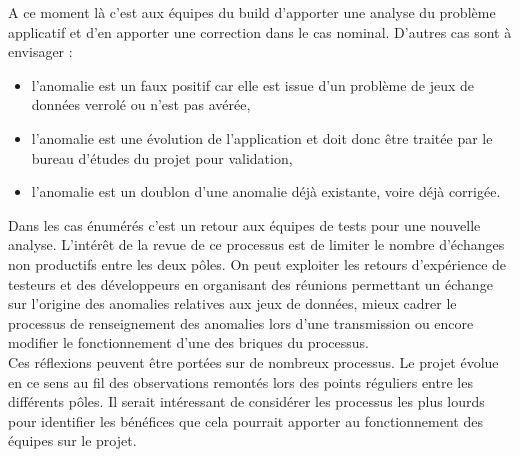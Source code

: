 \documentclass[12pt,a4paper]{article}
\begin{document}
A ce moment là c'est aux équipes du build d'apporter une analyse du problème applicatif et d'en apporter une correction dans le cas nominal. D'autres cas sont à envisager :
\begin{itemize}
\item l'anomalie est un faux positif car elle est issue d'un problème de jeux de données verrolé ou n'est pas avérée,
\item l'anomalie est une évolution de l'application et doit donc être traitée par le bureau d'études du projet pour validation,
\item l'anomalie est un doublon d'une anomalie déjà existante, voire déjà corrigée.
\end{itemize} 
Dans les cas énumérés c'est un retour aux équipes de tests pour une nouvelle analyse. L'intérêt de la revue de ce processus est de limiter le nombre d'échanges non productifs entre les deux pôles. On peut exploiter les retours d'expérience de testeurs et des développeurs en organisant des réunions permettant un échange sur l'origine des anomalies relatives aux jeux de données, mieux cadrer le processus de renseignement des anomalies lors d'une transmission ou encore modifier le fonctionnement d'une des briques du processus.\\
Ces réflexions peuvent être portées sur de nombreux processus. Le projet évolue en ce sens au fil des observations remontés lors des points réguliers entre les différents pôles. Il serait intéressant de considérer les processus les plus lourds pour identifier les bénéfices que cela pourrait apporter au fonctionnement des équipes sur le projet.

\clearpage
\newpage
\end{document}
